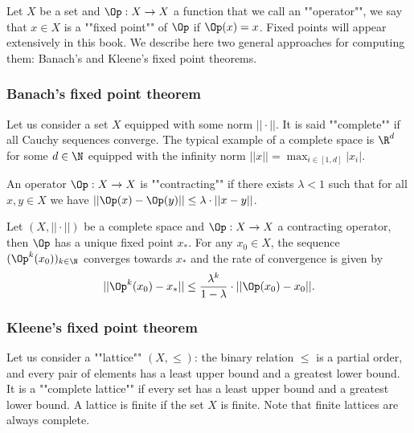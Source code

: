 Let $X$ be a set and $\Op : X \to X$ a function that we call an ""operator"", we say that $x \in X$ is a ""fixed point"" of $\Op$ if $\Op(x) = x$.
Fixed points will appear extensively in this book. 
We describe here two general approaches for computing them: Banach's and Kleene's fixed point theorems.

\subsubsection*{Banach's fixed point theorem}
Let us consider a set $X$ equipped with some norm $||\cdot||$.
It is said ""complete"" if all Cauchy sequences converge.
The typical example of a complete space is $\R^d$ for some $d \in \N$ equipped with the infinity norm $||x|| = \max_{i \in [1,d]} |x_i|$.

An operator $\Op : X \to X$ is ""contracting"" if there exists $\lambda < 1$ such that for all $x,y \in X$ we have
$||\Op(x) - \Op(y)|| \le \lambda \cdot ||x - y||$.

\begin{theorem}
\label{1-thm:banach}
Let $(X,||\cdot||)$ be a complete space and $\Op : X \to X$ a contracting operator, then $\Op$ has a unique fixed point $x_*$.
For any $x_0 \in X$, the sequence $(\Op^k(x_0))_{k \in \N}$ converges towards $x_*$ and the rate of convergence is given by
\[
||\Op^k(x_0) - x_*|| \le \frac{\lambda^k}{1 - \lambda} \cdot ||\Op(x_0) - x_0||.
\]
\end{theorem}

%

\subsubsection*{Kleene's fixed point theorem}
Let us consider a ""lattice"" $(X,\le)$: the binary relation $\le$ is a partial order, and every pair of elements has a least upper bound and a greatest lower bound. It is a ""complete lattice"" if every set has a least upper bound and a greatest lower bound.
A lattice is finite if the set $X$ is finite.
Note that finite lattices are always complete.

